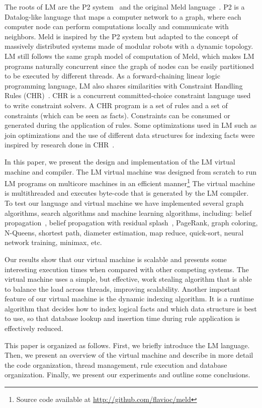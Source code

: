The roots of LM are the P2 system~\cite{Loo-condie-garofalakis-p2} and
the original Meld
language~\cite{ashley-rollman-derosa-iros07wksp,ashley-rollman-iclp09}. P2
is a Datalog-like language that maps a computer network to a graph,
where each computer node can perform computations locally and
communicate with neighbors. Meld is inspired by the P2 system
but adapted to the concept of massively distributed systems made of
modular robots with a dynamic topology. LM still follows the same
graph model of computation of Meld, which makes LM programs naturally
concurrent since the graph of nodes can be easily partitioned to be
executed by different threads. As a forward-chaining linear logic
programming language, LM also shares similarities with Constraint
Handling Rules
(CHR)~\cite{Betz:2005kx,DBLP:journals/corr/abs-1006-3039}.  CHR is a
concurrent committed-choice constraint language used to write
constraint solvers. A CHR program is a set of rules and a set of
constraints (which can be seen as facts). Constraints can be consumed
or generated during the application of rules. Some optimizations
used in LM such as join optimizations and the use of different data
structures for indexing facts were inspired by research done in
CHR~\cite{DBLP:journals/corr/cs-PL-0408025}.

In this paper, we present the design and implementation of the LM virtual machine
and compiler.
The LM virtual machine was designed from scratch to run LM programs on
multicore machines in an efficient manner\footnote{Source code available at \url{http://github.com/flavioc/meld}}
The virtual machine is multithreaded and executes byte-code that is generated
by the LM compiler. To test our language and virtual machine we have implemented several graph algorithms, search
algorithms and machine learning algorithms, including: belief
propagation~\cite{Gonzalez+al:aistats09paraml}, belief propagation
with residual splash~\cite{Gonzalez+al:aistats09paraml}, PageRank,
graph coloring, N-Queens, shortest path, diameter estimation, map
reduce, quick-sort, neural network training, minimax, etc.

Our results show that our virtual machine is scalable and presents some interesting
execution times when compared with other competing systems.
The virtual machine uses a simple, but effective, work stealing algorithm
that is able to balance the load across threads, improving scalability.
Another important feature of our virtual machine is the dynamic indexing algorithm.
It is a runtime algorithm that decides how to index logical facts and which
data structure is best to use, so that database lookup and insertion time during rule application
is effectively reduced.

This paper is organized as follows. First, we briefly introduce the LM
language. Then, we present an overview of the virtual machine and
describe in more detail the code organization, thread management, rule
execution and database organization. Finally, we present our experiments
and outline some conclusions.
